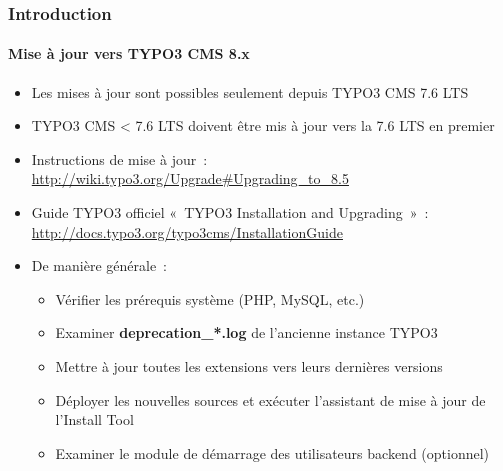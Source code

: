 \begin{frame}[fragile]
	\frametitle{Introduction}
	\framesubtitle{Mise à jour vers TYPO3 CMS 8.x}

	\begin{itemize}
		\item Les mises à jour sont possibles seulement depuis TYPO3 CMS 7.6 LTS
		\item TYPO3 CMS < 7.6 LTS doivent être mis à jour vers la 7.6 LTS en premier
	\end{itemize}

	\begin{itemize}

		\item Instructions de mise à jour~:\newline
			\smaller\url{http://wiki.typo3.org/Upgrade#Upgrading_to_8.5}\normalsize
		\item Guide TYPO3 officiel «~TYPO3 Installation and Upgrading~»~:
			\smaller\url{http://docs.typo3.org/typo3cms/InstallationGuide}\normalsize
		\item De manière générale~:
			\begin{itemize}
				\item Vérifier les prérequis système \small(PHP, MySQL, etc.)
				\item Examiner \textbf{deprecation\_*.log} de l'ancienne instance TYPO3
				\item Mettre à jour toutes les extensions vers leurs dernières versions
				\item Déployer les nouvelles sources et exécuter l'assistant de mise à jour de l'Install Tool
				\item Examiner le module de démarrage des utilisateurs backend (optionnel)
			\end{itemize}
	\end{itemize}

\end{frame}


